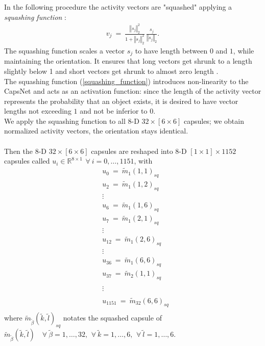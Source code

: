 \documentclass{article}
\begin{document}
{In the following procedure the activity vectors are "squashed" applying a \textit{squashing function} \cite{hinton17}:
\begin{align} \label{squashing_function}
v_j \ = \ \frac{\left\Vert{s_j} \right\Vert_2^2}{1+\left\Vert{s_j} \right\Vert_2^2} \, \frac{s_j}{\left\Vert{s_j} \right\Vert_2}.
\end{align}
The squashing function scales a vector $s_j$ to have length between $0$ and $1$, while maintaining the orientation. It ensures that long vectors get shrunk to a length slightly below 1 and short vectors get shrunk to almost zero length \cite{hinton17}.\\
The squashing function (\ref{squashing_function}) introduces non-linearity to the CapsNet and acts as an activation function: since the length of the activity vector represents the probability that an object exists, it is desired to have vector lengths not exceeding $1$ and not be inferior to $0$.\\
We apply the squashing function to all $8$-D $32 \times [6 \times 6]$ capsules; we obtain normalized activity vectors, the orientation stays identical.\\
\\
Then the $8$-D $ 32 \times [6 \times 6]$ capsules are reshaped into $8$-D $[1 \times 1] \times 1152 $ capsules called $u_i \in \mathbb{R}^{8 \times 1} \, \ \forall \ i=0, \ldots , 1151$, with
\begin{align*}
&u_0 \ = \ \tilde{m}_{1}(1,1)_{sq}\\
&u_2 \ = \ \tilde{m}_{1}(1,2)_{sq}\\
&\vdots \\
&u_6 \ = \ \tilde{m}_{1}(1,6)_{sq}\\
&u_7 \ = \ \tilde{m}_{1}(2,1)_{sq}\\
&\vdots \\
&u_{12} \ = \ \tilde{m}_{1}(2,6)_{sq}\\
&\vdots \\
&u_{36} \ = \ \tilde{m}_{1}(6,6)_{sq}\\
&u_{37} \ = \ \tilde{m}_{2}(1,1)_{sq}\\
\\
&\vdots \\
\\
&u_{1151} \ = \ \tilde{m}_{32}(6,6)_{sq}\\
\end{align*}
where $\tilde{m}_{\tilde{\beta}}(\tilde{k},\tilde{l})_{sq}$ notates the squashed capsule of $\tilde{m}_{\tilde{\beta}}(\tilde{k},\tilde{l}) \quad \forall \ \tilde{\beta}=1, \ldots, 32, \ \, \forall \ \tilde{k}=1, \ldots, 6, \ \, \forall \ \tilde{l}=1, \ldots, 6$. \\
}
\end{document}

